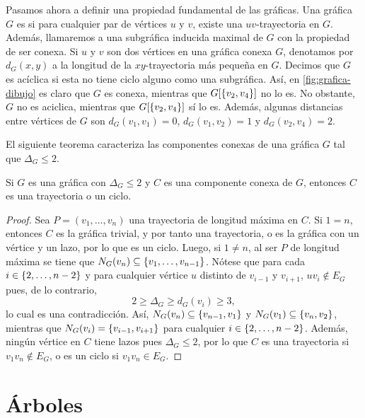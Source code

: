 Pasamos ahora a definir una propiedad fundamental de las gr\'aficas. Una
gr\'afica $G$ es  si para cualquier par de
v\'ertices $u$ y $v$, existe una $uv$-trayectoria en $G$. Adem\'as, llamaremos
 a una subgr\'afica inducida maximal de $G$ con la
propiedad de ser conexa. Si $u$ y $v$ son dos v\'ertices en una gr\'afica conexa
$G$, denotamos por $d_G(x,y)$ a la longitud de la $xy$-trayectoria m\'as
peque\~na en $G$. Decimos que $G$ es ac\'iclica si esta no tiene ciclo alguno
como una subgr\'afica. As\'i, en \cref{fig:grafica-dibujo} es claro que $G$ es
conexa, mientras que $G[\left\{ v_2,v_4\right\}]$ no lo es. No obstante, $G$ no es aciclica,
mientras que $G[\left\{ v_2,v_4\right\}]$ s\'i lo es. Adem\'as, algunas distancias entre
v\'ertices de $G$ son $d_G(v_1,v_1)=0$, $d_G(v_1,v_2)=1$ y $d_G(v_2,v_4)=2$.

El siguiente teorema caracteriza las componentes conexas de una gr\'afica $G$
tal que $\Delta_G\leq 2$.

\begin{teorema}
\label{teo:compconexa}
  Si $G$ es una gr\'afica con $\Delta_G\leq 2$ y $C$ es una componente conexa de
  $G$, entonces $C$ es una trayectoria o un ciclo.
\end{teorema}

\begin{proof}
  Sea $P=(v_1,\dots,v_n)$ una trayectoria de longitud m\'axima en $C$. Si $1=n$,
  entonces $C$ es la gr\'afica trivial, y por tanto una trayectoria, o es la
  gr\'afica con un v\'ertice y un lazo, por lo que es un ciclo. Luego, si $1\neq
  n$, al ser $P$ de longitud m\'axima se tiene que $N_G(v_n)\subseteq
  \{v_1,\dots, v_{n-1}\}$. N\'otese que para cada $i\in\{2,\dots, n-2\}$ y para
  cualquier v\'ertice $u$ distinto de $v_{i-1}$ y $v_{i+1}$, $uv_i\notin E_G$
  pues, de lo contrario,
  \[
      2\ge \Delta_G \ge d_G(v_i) \ge 3,  
  \]
  lo cual es una contradicci\'on. As\'i, $N_G(v_n)\subseteq \left\{ v_{n-1},v_1\right\}$ y
  $N_G(v_1)\subseteq \left\{ v_n,v_2\right\}$, mientras que $N_G(v_i)=\left\{ v_{i-1},v_{i+1}\right\}$
  para cualquier $i\in\{2,\dots, n-2\}$. Adem\'as, ning\'un v\'ertice en $C$ tiene
  lazos pues $\Delta_G\leq 2$, por lo que $C$ es una trayectoria si
  $v_1v_n\notin E_G$, o es un ciclo si $v_1v_n\in E_G$.

\end{proof}

\section{\'Arboles}


